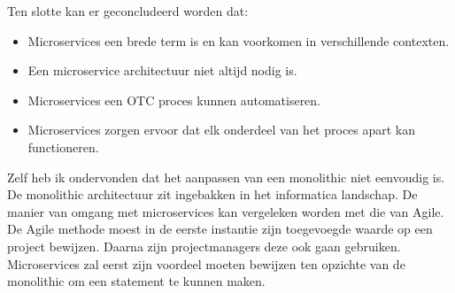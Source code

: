 Ten slotte kan er geconcludeerd worden dat:
\begin{itemize}
	\item Microservices een brede term is en kan voorkomen in verschillende contexten.
	\item Een microservice architectuur niet altijd nodig is.
	\item Microservices een OTC proces kunnen automatiseren.
	\item Microservices zorgen ervoor dat elk onderdeel van het proces apart kan functioneren.
\end{itemize}

Zelf heb ik ondervonden dat het aanpassen van een monolithic niet eenvoudig is. De monolithic architectuur zit ingebakken in het informatica landschap. De manier van omgang met microservices kan vergeleken worden met die van Agile. De Agile methode moest in de eerste instantie zijn toegevoegde waarde op een project bewijzen. Daarna zijn projectmanagers deze ook gaan gebruiken. Microservices zal eerst zijn voordeel moeten bewijzen ten opzichte van de monolithic om een statement te kunnen maken.



